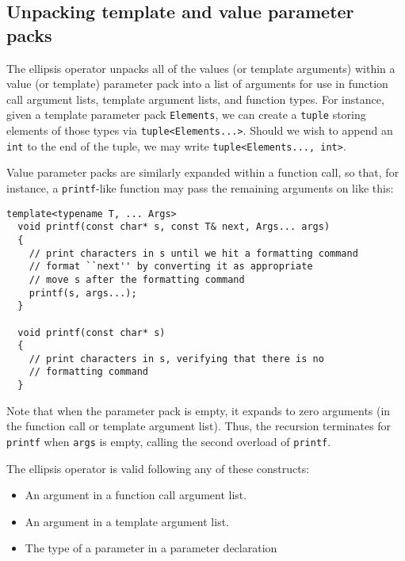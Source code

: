 \documentclass{article}
\begin{document}
\subsection{Unpacking template and value parameter packs}
The ellipsis operator unpacks all of the values (or template
arguments) within a value (or template) parameter pack into a list of
arguments for use in function call argument lists, template argument
lists, and function types. For instance, given a template parameter pack
{\tt Elements}, we can create a {\tt tuple} storing elements of those
types via {\tt tuple<Elements...>}. Should we wish to append an {\tt int}
to the end of the tuple, we may write {\tt tuple<Elements..., int>}.

Value parameter packs are similarly expanded within a function call,
so that, for instance, a {\tt printf}-like function may pass the
remaining arguments on like this:
\begin{verbatim}
template<typename T, ... Args>
  void printf(const char* s, const T& next, Args... args)
  {
    // print characters in s until we hit a formatting command
    // format ``next'' by converting it as appropriate
    // move s after the formatting command
    printf(s, args...); 
  }

  void printf(const char* s)
  {
    // print characters in s, verifying that there is no 
    // formatting command
  }
\end{verbatim}

Note that when the parameter pack is empty, it expands to zero
arguments (in the function call or template argument list). Thus, the
recursion terminates for \texttt{printf} when {\tt args} is empty,
calling the second overload of \texttt{printf}.

The ellipsis operator is valid following any of these constructs:
\begin{itemize}
\item An argument in a function call argument list.
\item An argument in a template argument list.
\item The type of a parameter in a parameter declaration
\end{itemize}
\end{document}
